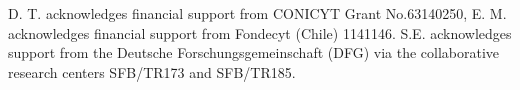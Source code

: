 \documentclass[aps,twocolumn,showpacs,floatfix,prl]{revtex4}
\begin{document}





\begin{acknowledgments}
D. T. acknowledges financial support from CONICYT Grant No.63140250,  E. M. acknowledges financial support from Fondecyt (Chile) 1141146.  S.E. acknowledges support from the Deutsche Forschungsgemeinschaft (DFG) via the collaborative research centers SFB/TR173 and SFB/TR185.
\end{acknowledgments}
%
%

\end{document}
